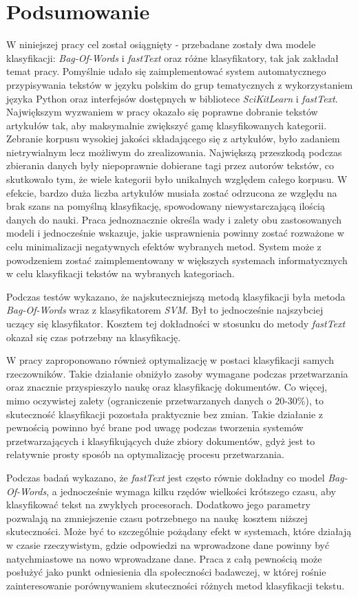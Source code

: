 \chapter{Podsumowanie}
W niniejszej pracy cel został osiągnięty - przebadane zostały dwa modele klasyfikacji: \textit{Bag-Of-Words} i \textit{fastText} oraz różne klasyfikatory, tak jak zakładał temat pracy. Pomyślnie udało się zaimplementować system automatycznego przypisywania tekstów w języku polskim do grup tematycznych z wykorzystaniem języka Python oraz interfejsów dostępnych w bibliotece \textit{SciKitLearn} i \textit{fastText}. Największym wyzwaniem w pracy okazało się poprawne dobranie tekstów artykułów tak, aby maksymalnie zwiększyć gamę klasyfikowanych kategorii. Zebranie korpusu wysokiej jakości składającego się z artykułów, było zadaniem nietrywialnym lecz możliwym do zrealizowania. Największą przeszkodą podczas zbierania danych były niepoprawnie dobierane tagi przez autorów tekstów, co skutkowało tym, że wiele kategorii było unikalnych względem całego korpusu. W efekcie, bardzo duża liczba artykułów musiała zostać odrzucona ze względu na brak szans na pomyślną klasyfikację, spowodowany niewystarczającą ilością danych do nauki. Praca jednoznacznie określa wady i zalety obu zastosowanych modeli i jednocześnie wskazuje, jakie usprawnienia powinny zostać rozważone w celu minimalizacji negatywnych efektów wybranych metod. System może z powodzeniem zostać zaimplementowany w większych systemach informatycznych w celu klasyfikacji tekstów na wybranych kategoriach. 

Podczas testów wykazano, że najskuteczniejszą metodą klasyfikacji była metoda \textit{Bag-Of-Words} wraz z klasyfikatorem \textit{SVM}. Był to jednocześnie  najszybciej uczący się klasyfikator. Kosztem tej dokładności w stosunku do metody \textit{fastText} okazał się czas potrzebny na klasyfikację.

W pracy zaproponowano również optymalizację w postaci klasyfikacji samych rzeczowników. Takie działanie obniżyło zasoby wymagane podczas przetwarzania oraz znacznie przyspieszyło naukę oraz klasyfikację dokumentów. Co więcej, mimo oczywistej zalety (ograniczenie przetwarzanych danych o 20-30\%), to skuteczność klasyfikacji pozostała praktycznie bez zmian. Takie działanie z pewnością powinno być brane pod uwagę podczas tworzenia systemów przetwarzających i klasyfikujących duże zbiory dokumentów, gdyż jest to relatywnie prosty sposób na optymalizację procesu przetwarzania.  

Podczas badań wykazano, że \textit{fastText} jest często równie dokładny co model \textit{Bag-Of-Words}, a jednocześnie wymaga kilku rzędów wielkości krótszego czasu, aby klasyfikować tekst na zwykłych procesorach. Dodatkowo jego parametry pozwalają na zmniejszenie czasu potrzebnego na naukę kosztem niższej skuteczności. Może być to szczególnie pożądany efekt w systemach, które działają w czasie rzeczywistym, gdzie odpowiedzi na wprowadzone dane powinny być natychmiastowe na nowo wprowadzane dane. Praca z całą pewnością może posłużyć jako punkt odniesienia dla społeczności badawczej, w której rośnie zainteresowanie porównywaniem skuteczności różnych metod klasyfikacji tekstu. 

